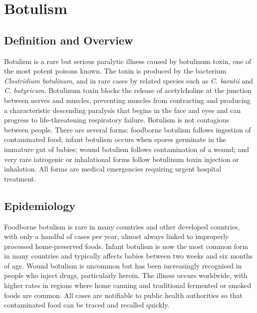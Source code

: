 \chapter{Botulism}

\section*{Definition and Overview}
Botulism is a rare but serious paralytic illness caused by botulinum toxin, one of the most potent poisons known. The toxin is produced by the bacterium \textit{Clostridium botulinum}, and in rare cases by related species such as \textit{C. baratii} and \textit{C. butyricum}. Botulinum toxin blocks the release of acetylcholine at the junction between nerves and muscles, preventing muscles from contracting and producing a characteristic descending paralysis that begins in the face and eyes and can progress to life-threatening respiratory failure. Botulism is not contagious between people. There are several forms: foodborne botulism follows ingestion of contaminated food; infant botulism occurs when spores germinate in the immature gut of babies; wound botulism follows contamination of a wound; and very rare iatrogenic or inhalational forms follow botulinum toxin injection or inhalation. All forms are medical emergencies requiring urgent hospital treatment.

\section*{Epidemiology}
Foodborne botulism is rare in many countries and other developed countries, with only a handful of cases per year, almost always linked to improperly processed home-preserved foods. Infant botulism is now the most common form in many countries and typically affects babies between two weeks and six months of age. Wound botulism is uncommon but has been increasingly recognised in people who inject drugs, particularly heroin. The illness occurs worldwide, with higher rates in regions where home canning and traditional fermented or smoked foods are common. All cases are notifiable to public health authorities so that contaminated food can be traced and recalled quickly.

